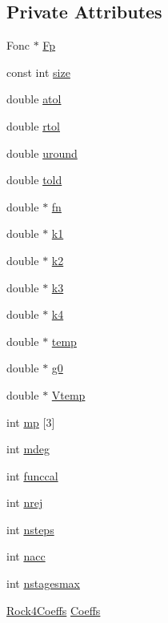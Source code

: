 \subsection*{Private Attributes}
\begin{DoxyCompactItemize}
\item 
Fonc $\ast$ \hyperlink{classodes_1_1Rock4_a898f96db31273a1c54bd589bd6929cfa}{Fp}
\item 
const int \hyperlink{classodes_1_1Rock4_a92fce238f76152ab800a70c283eaec8a}{size}
\item 
double \hyperlink{classodes_1_1Rock4_a12e4452e4125f1349a279c107e84e7df}{atol}
\item 
double \hyperlink{classodes_1_1Rock4_a358756fc102debb458cd1351efb38ddc}{rtol}
\item 
double \hyperlink{classodes_1_1Rock4_a796e21d91cd4a5b19b1054bf7dfd6912}{uround}
\item 
double \hyperlink{classodes_1_1Rock4_a2a2c392ee50d2a4e044d0f4283af3480}{told}
\item 
double $\ast$ \hyperlink{classodes_1_1Rock4_a27b36e1d22c1cece0f3e88ddd7a2dc5f}{fn}
\item 
double $\ast$ \hyperlink{classodes_1_1Rock4_a608f2e818f5ff65f24e7fb38f054b4de}{k1}
\item 
double $\ast$ \hyperlink{classodes_1_1Rock4_a7c9731b0de70405a4f14c0e8c5a8b498}{k2}
\item 
double $\ast$ \hyperlink{classodes_1_1Rock4_a710b013eeed6e9959063a6a444dd9a12}{k3}
\item 
double $\ast$ \hyperlink{classodes_1_1Rock4_ad9bed2973a3e0748ecdaffefed8dffbd}{k4}
\item 
double $\ast$ \hyperlink{classodes_1_1Rock4_ac57b7b19f52d5eacb83a6a0fdf8013a1}{temp}
\item 
double $\ast$ \hyperlink{classodes_1_1Rock4_aeec7fd59c059466e1759178222ce678e}{g0}
\item 
double $\ast$ \hyperlink{classodes_1_1Rock4_ab00e963339b09af3e02bc80192f16ff2}{Vtemp}
\item 
int \hyperlink{classodes_1_1Rock4_a42b5b3858362b8a16c7627a46314fa9e}{mp} \mbox{[}3\mbox{]}
\item 
int \hyperlink{classodes_1_1Rock4_a80db44ee8d908fcb96ca4d6075a46ee4}{mdeg}
\item 
int \hyperlink{classodes_1_1Rock4_a268f70915136d0bb03f6262e3b341960}{funccal}
\item 
int \hyperlink{classodes_1_1Rock4_ab63364c94fc6901269c195c0d7a0565b}{nrej}
\item 
int \hyperlink{classodes_1_1Rock4_a598d53853fcd0955898167560d060ee2}{nsteps}
\item 
int \hyperlink{classodes_1_1Rock4_af33e626e975c3ea92a6d33962773ccb9}{nacc}
\item 
int \hyperlink{classodes_1_1Rock4_a362d2c3d57d65fdaf5af1e03befc34f9}{nstagesmax}
\item 
\hyperlink{structodes_1_1Rock4Coeffs}{Rock4\-Coeffs} \hyperlink{classodes_1_1Rock4_a7ec9346124f5026ac28a8f0d6833238a}{Coeffs}
\end{DoxyCompactItemize}


